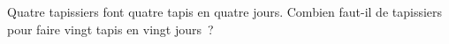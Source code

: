 \documentclass[exercice]{thedocument}%
\begin{document}
%
Quatre tapissiers font quatre tapis en quatre jours.\vskip10pt
Combien faut-il de tapissiers pour faire vingt tapis en vingt jours~?
\end{document}

